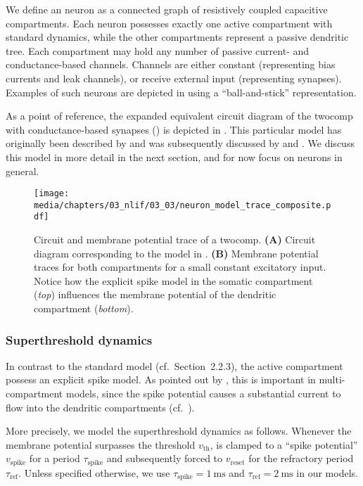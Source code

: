 We define an \nlif neuron as a connected graph of resistively coupled capacitive compartments.
Each neuron possesses exactly one active compartment with standard \LIF dynamics, while the other compartments represent a passive dendritic tree.
Each compartment may hold any number of passive current- and conductance-based channels.
Channels are either constant (representing bias currents and leak channels), or receive external input (representing synapses).
Examples of such neurons are depicted in  using a \enquote{ball-and-stick} representation.

As a point of reference, the expanded equivalent circuit diagram of the \gls{twocomp} with conductance-based synapses () is depicted in .
This particular model has originally been described by \citet{vu1993mechanism} and was subsequently discussed by \citet{koch1999biophysics} and \citet{capaday2006direct}.
We discuss this model in more detail in the next section, and for now focus on \nlif neurons in general.

\begin{figure}
	\texttt{[image: media/chapters/03\_nlif/03\_03/neuron\_model\_trace\_composite.pdf]}%
	{\label{fig:two_comp_lif_circuit}}
	{\label{fig:two_comp_lif_trace}}
	\caption[Circuit and membrane potential trace of a two-compartment LIF neuron]{Circuit and membrane potential trace of a \gls{twocomp}.
	\textbf{(A)} Circuit diagram corresponding to the model in .
	\textbf{(B)} Membrane potential traces for both compartments for a small constant excitatory input.
	Notice how the explicit spike model in the somatic compartment (\emph{top}) influences the membrane potential of the dendritic compartment (\emph{bottom}).}
	\label{fig:two_comp_lif}
\end{figure}

\subsubsection{Superthreshold dynamics}
In contrast to the standard \LIF model (cf.~Section~2.2.3), the active \nlif compartment possess an explicit spike model.
As pointed out by \citet{capaday2006direct}, this is important in multi-compartment models, since the spike potential causes a substantial current to flow into the dendritic compartments (cf.~).

More precisely, we model the superthreshold dynamics as follows.
Whenever the membrane potential \vMem surpasses the threshold $v_\mathrm{th}$, \vMem is clamped to a \enquote{spike potential} $v_\mathrm{spike}$ for a period $\tau_\mathrm{spike}$ and subsequently forced to $v_\mathrm{reset}$ for the refractory period $\tau_\mathrm{ref}$.
Unless specified otherwise, we use $\tau_\mathrm{spike} = \SI{1}{\milli\second}$ and $\tau_\mathrm{ref} = \SI{2}{\milli\second}$ in our models.

